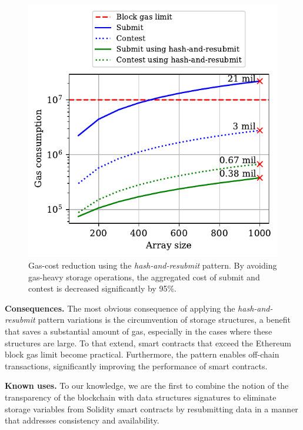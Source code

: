 \begin{figure}[h!]
\begin{center}
\includegraphics[width=1 \columnwidth]{figures/har-example.pdf}
\end{center}
\caption{Gas-cost reduction using the \emph{hash-and-resubmit} pattern. By
    avoiding gas-heavy storage operations, the aggregated cost of
    \textsf{submit} and \textsf{contest} is decreased significantly by 95\%.}
\label{fig:har-example}
\end{figure}

\noindent \textbf{Consequences.} The most obvious consequence of applying the
\emph{hash-and-resubmit} pattern variations is the circumvention of storage
structures, a benefit that saves a substantial amount of gas, especially in the
cases where these structures are large. To that extend, smart contracts that
exceed the Ethereum block gas limit become practical. Furthermore, the pattern
enables off-chain transactions, significantly improving the performance of
smart contracts.

\noindent \textbf{Known uses.} To our knowledge, we are the first to combine
the notion of the transparency of the blockchain with data structures
signatures to eliminate storage variables from Solidity smart contracts by
resubmitting data in a manner that addresses consistency and availability.

